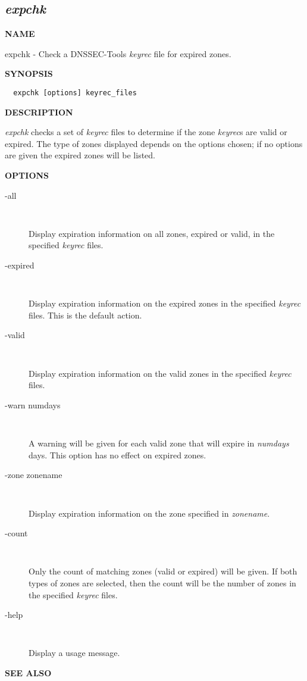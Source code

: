 \clearpage

\subsection{{\it expchk}}


{\bf NAME}

expchk - Check a DNSSEC-Tools {\it keyrec} file for expired zones.

{\bf SYNOPSIS}

\begin{verbatim}
  expchk [options] keyrec_files
\end{verbatim}

{\bf DESCRIPTION}

{\it expchk} checks a set of {\it keyrec} files to determine if the zone {\it
keyrec}s are valid or expired.  The type of zones displayed depends on the
options chosen; if no options are given the expired zones will be listed.

{\bf OPTIONS}

\begin{description}

\item [-all]\verb" "

Display expiration information on all zones, expired or valid, in the
specified {\it keyrec} files.

\item [-expired]\verb" "

Display expiration information on the expired zones in the specified
{\it keyrec} files.  This is the default action.

\item [-valid]\verb" "

Display expiration information on the valid zones in the specified
{\it keyrec} files.

\item [-warn numdays]\verb" "

A warning will be given for each valid zone that will expire in {\it numdays}
days.  This option has no effect on expired zones.

\item [-zone zonename]\verb" "

Display expiration information on the zone specified in {\it zonename}.

\item [-count]\verb" "

Only the count of matching zones (valid or expired) will be given.  If both
types of zones are selected, then the count will be the number of zones in the
specified {\it keyrec} files.

\item [-help]\verb" "

Display a usage message.

\end{description}

{\bf SEE ALSO}


